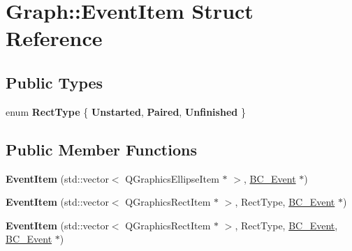 \hypertarget{struct_graph_1_1_event_item}{}\section{Graph\+:\+:Event\+Item Struct Reference}
\label{struct_graph_1_1_event_item}
\subsection*{Public Types}
\begin{DoxyCompactItemize}
\item 
enum {\bfseries Rect\+Type} \{ {\bfseries Unstarted}, 
{\bfseries Paired}, 
{\bfseries Unfinished}
 \}\hypertarget{struct_graph_1_1_event_item_acf9786e04fdd442af0a2fb1c96bf4d88}{}\label{struct_graph_1_1_event_item_acf9786e04fdd442af0a2fb1c96bf4d88}

\end{DoxyCompactItemize}
\subsection*{Public Member Functions}
\begin{DoxyCompactItemize}
\item 
{\bfseries Event\+Item} (std\+::vector$<$ Q\+Graphics\+Ellipse\+Item $\ast$ $>$, \hyperlink{class_b_c___event}{B\+C\+\_\+\+Event} $\ast$)\hypertarget{struct_graph_1_1_event_item_aaad426402cf429da647b1ab05c8dfa73}{}\label{struct_graph_1_1_event_item_aaad426402cf429da647b1ab05c8dfa73}

\item 
{\bfseries Event\+Item} (std\+::vector$<$ Q\+Graphics\+Rect\+Item $\ast$ $>$, Rect\+Type, \hyperlink{class_b_c___event}{B\+C\+\_\+\+Event} $\ast$)\hypertarget{struct_graph_1_1_event_item_a3f8907f6ad3061fe654b908b55d7979c}{}\label{struct_graph_1_1_event_item_a3f8907f6ad3061fe654b908b55d7979c}

\item 
{\bfseries Event\+Item} (std\+::vector$<$ Q\+Graphics\+Rect\+Item $\ast$ $>$, Rect\+Type, \hyperlink{class_b_c___event}{B\+C\+\_\+\+Event}, \hyperlink{class_b_c___event}{B\+C\+\_\+\+Event} $\ast$)\hypertarget{struct_graph_1_1_event_item_ad027ec26db668cb89ca3a332589d27d1}{}\label{struct_graph_1_1_event_item_ad027ec26db668cb89ca3a332589d27d1}

\end{DoxyCompactItemize}
